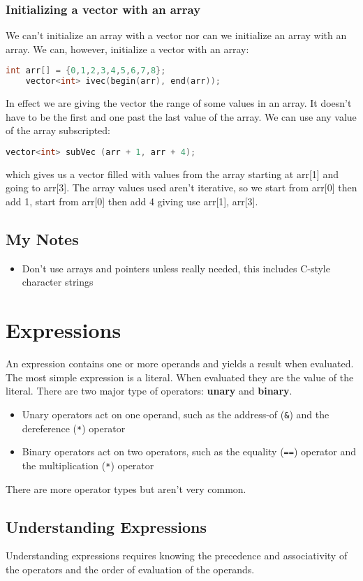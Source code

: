 \documentclass[12pt, a4paper]{report}
\begin{document}
\subsection{Initializing a vector with an array}
We can't initialize an array with a vector nor can we initialize an array with an array.
We can, however, initialize a vector with an array:
\begin{lstlisting}[language=C++]
    int arr[] = {0,1,2,3,4,5,6,7,8};
    vector<int> ivec(begin(arr), end(arr));
\end{lstlisting}
In effect we are giving the vector the range of some values in an array.
It doesn't have to be the first and one past the last value of the array.
We can use any value of the array subscripted:
\begin{lstlisting}[language=C++]
    vector<int> subVec (arr + 1, arr + 4);
\end{lstlisting}
which gives us a vector filled with values from the array starting at arr[1] and going to arr[3].
The array values used aren't iterative, so we start from arr[0] then add 1, start from arr[0] then add 4 giving use arr[1], arr[3].
\section{My Notes}
\begin{itemize}
  \item Don't use arrays and pointers unless really needed, this includes C-style character strings
\end{itemize}

\chapter{Expressions}
An expression contains one or more operands and yields a result when evaluated.
The most simple expression is a literal.
When evaluated they are the value of the literal.
There are two major type of operators: \textbf{unary} and \textbf{binary}.
\begin{itemize}
  \item Unary operators act on one operand, such as the address-of (\verb|&|) and the dereference (\verb|*|) operator
  \item Binary operators act on two operators, such as the equality (\verb|==|) operator and the multiplication (\verb|*|) operator
\end{itemize}
There are more operator types but aren't very common.

\section{Understanding Expressions}
Understanding expressions requires knowing the precedence and associativity of the operators and the order of evaluation of the operands.
\end{document}
